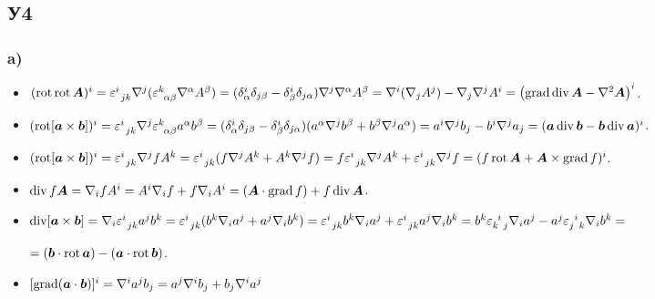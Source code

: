 \subsection*{У4}
\subsubsection*{a)}
\begin{itemize}
	\item $(\mathop{\mathrm{rot}}\nolimits \mathop{\mathrm{rot}}\nolimits \mbox{\boldmath $A$})^i 
	= 
	\varepsilon_{\phantom{0} j k}^{i} \nabla^j (\varepsilon_{\phantom{0} \alpha \beta}^{k} \nabla^\alpha A^\beta)
	=
	(\delta_{\alpha}^{i} \delta_{j \beta} - \delta_{\beta}^{i} \delta_{j \alpha}) \nabla^j \nabla^\alpha A^\beta
	=
	\nabla^i (\nabla_j A^j) - \nabla_j \nabla^j A^i
	=
	\left(
	\mathop{\mathrm{grad}}\nolimits \mathop{\mathrm{div}}\nolimits \mbox{\boldmath $A$} - \nabla^2 \mbox{\boldmath $A$}
	\right)^i$.

	\item $(\mathop{\mathrm{rot}}\nolimits [\mbox{\boldmath $a$} \times \mbox{\boldmath $b$}])^i 
	=
	\varepsilon_{\phantom{0} j k}^{i} \nabla^j \varepsilon_{\phantom{0} \alpha \beta}^{k} a^\alpha b^\beta
	=
	(\delta_{\alpha}^{i} \delta_{j \beta} - \delta_{\beta}^{i} \delta_{j \alpha})(a^\alpha \nabla^j b^\beta + b^\beta \nabla^j a^\alpha)
	=
	a^i \nabla^j b_j - b^i \nabla^j a_j 
	=
	(\mbox{\boldmath $a$} \mathop{\mathrm{div}}\nolimits \mbox{\boldmath $b$} - \mbox{\boldmath $b$} \mathop{\mathrm{div}}\nolimits \mbox{\boldmath $a$})^i$.

	\item $(\mathop{\mathrm{rot}}\nolimits [\mbox{\boldmath $a$} \times \mbox{\boldmath $b$}])^i
	=
	\varepsilon_{\phantom{0} j k}^{i} \nabla^j f A^k = \varepsilon_{\phantom{0} j k}^{i} (f \nabla^j A^k + A^k \nabla^j f)
	=
	f \varepsilon_{\phantom{0} j k}^{i} \nabla^j A^k + \varepsilon_{\phantom{0} j k}^{i} \nabla^j f
	=
	(f \mathop{\mathrm{rot}}\nolimits \mbox{\boldmath $A$} + \mbox{\boldmath $A$} \times \mathop{\mathrm{grad}}\nolimits f)^i$.

	\item $\mathop{\mathrm{div}}\nolimits f \mbox{\boldmath $A$} = \nabla_i f A^i = A^i \nabla_i f + f \nabla_i A^i
	=
	(\mbox{\boldmath $A$} \cdot \mathop{\mathrm{grad}}\nolimits f) + f \mathop{\mathrm{div}}\nolimits \mbox{\boldmath $A$}$.

	\item $\mathop{\mathrm{div}}\nolimits [\mbox{\boldmath $a$} \times \mbox{\boldmath $b$}] = \nabla_i \varepsilon_{\phantom{0} j k}^{i} a^j b^k = \varepsilon_{\phantom{0} j k}^{i} (b^k \nabla_i a^j + a^j \nabla_i b^k)
	=
	\varepsilon_{\phantom{0} j k}^{i} b^k \nabla_i a^j + \varepsilon_{\phantom{0} j k}^{i} a^j \nabla_i b^k
	=
	b^k \varepsilon_{k \phantom{0} j}^{ \phantom{0} i} \nabla_i a^j - a^j \varepsilon_{j \phantom{0} k}^{\phantom{0} i} \nabla_i b^k
	=$
	
	$=(\mbox{\boldmath $b$} \cdot \mathop{\mathrm{rot}}\nolimits \mbox{\boldmath $a$}) - (\mbox{\boldmath $a$} \cdot \mathop{\mathrm{rot}}\nolimits \mbox{\boldmath $b$})$.

	\item $[\mathop{\mathrm{grad}}\nolimits(\mbox{\boldmath $a$} \cdot \mbox{\boldmath $b$})]^i = \nabla^i a^j b_j = a^j \nabla^i b_j + b_j \nabla^i a^j$


\end{itemize}
